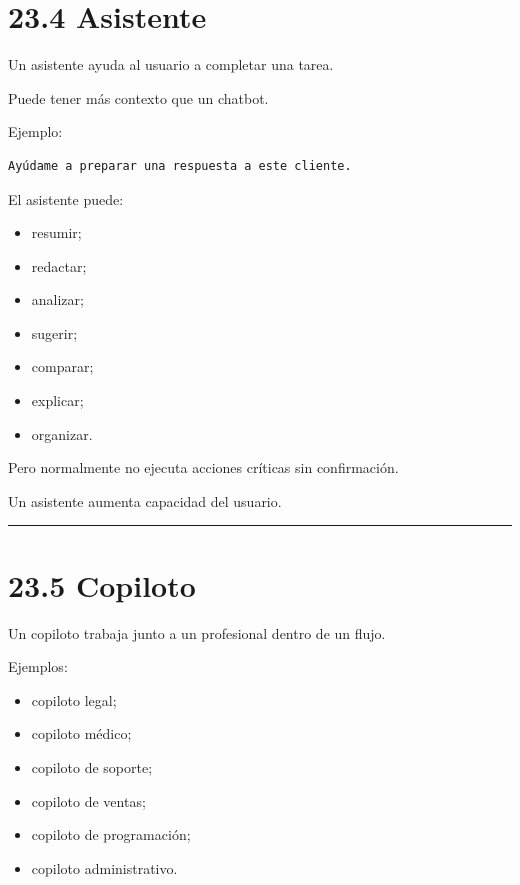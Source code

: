 \section{23.4 Asistente}\label{asistente-1}

Un asistente ayuda al usuario a completar una tarea.

Puede tener más contexto que un chatbot.

Ejemplo:

\begin{lstlisting}
Ayúdame a preparar una respuesta a este cliente.
\end{lstlisting}

El asistente puede:

\begin{itemize}
\tightlist
\item
  resumir;
\item
  redactar;
\item
  analizar;
\item
  sugerir;
\item
  comparar;
\item
  explicar;
\item
  organizar.
\end{itemize}

Pero normalmente no ejecuta acciones críticas sin confirmación.

Un asistente aumenta capacidad del usuario.

\begin{center}\rule{0.5\linewidth}{0.5pt}\end{center}

\section{23.5 Copiloto}\label{copiloto-1}

Un copiloto trabaja junto a un profesional dentro de un flujo.

Ejemplos:

\begin{itemize}
\tightlist
\item
  copiloto legal;
\item
  copiloto médico;
\item
  copiloto de soporte;
\item
  copiloto de ventas;
\item
  copiloto de programación;
\item
  copiloto administrativo.
\end{itemize}

